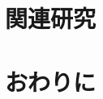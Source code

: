 \documentclass[submit]{ipsj_v2/UTF8/ipsj}
\begin{document}
\section{関連研究}
\label{sec:Related Work}

\section{おわりに}
\label{sec:Conclusion}




\end{document}
